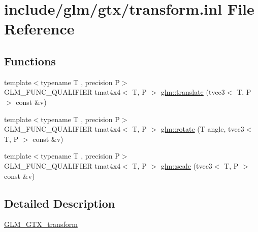 \hypertarget{transform_8inl}{}\section{include/glm/gtx/transform.inl File Reference}
\label{transform_8inl}
\subsection*{Functions}
\begin{DoxyCompactItemize}
\item 
{\footnotesize template$<$typename T , precision P$>$ }\\G\+L\+M\+\_\+\+F\+U\+N\+C\+\_\+\+Q\+U\+A\+L\+I\+F\+I\+ER tmat4x4$<$ T, P $>$ \hyperlink{group__gtx__transform_ga838c4505ef7f254ed05117b1ac9691fb}{glm\+::translate} (tvec3$<$ T, P $>$ const \&v)
\item 
{\footnotesize template$<$typename T , precision P$>$ }\\G\+L\+M\+\_\+\+F\+U\+N\+C\+\_\+\+Q\+U\+A\+L\+I\+F\+I\+ER tmat4x4$<$ T, P $>$ \hyperlink{group__gtx__transform_ga2020c91bf61e050882b3a5c18eada700}{glm\+::rotate} (T angle, tvec3$<$ T, P $>$ const \&v)
\item 
{\footnotesize template$<$typename T , precision P$>$ }\\G\+L\+M\+\_\+\+F\+U\+N\+C\+\_\+\+Q\+U\+A\+L\+I\+F\+I\+ER tmat4x4$<$ T, P $>$ \hyperlink{group__gtx__transform_ga1972d4a66a2e92637c8aaee598417a71}{glm\+::scale} (tvec3$<$ T, P $>$ const \&v)
\end{DoxyCompactItemize}


\subsection{Detailed Description}
\hyperlink{group__gtx__transform}{G\+L\+M\+\_\+\+G\+T\+X\+\_\+transform} 